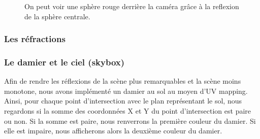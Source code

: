 \documentclass[11pt]{article}
\begin{document}
\begin{figure}[h!]

	\caption{On peut voir une sphère rouge derrière la caméra grâce à la reflexion de la sphère centrale.}
	\label{reflectionsDemo}
\end{figure}
\FloatBarrier

\subsubsection{Les réfractions}
\label{refractions}

\subsubsection{Le damier et le ciel (skybox)}
Afin de rendre les réflexions de la scène plus remarquables et la scène moins monotone, nous avons implémenté un damier au sol au moyen d'UV mapping. Ainsi, pour chaque point d'intersection avec le plan représentant le sol, nous regardons si la somme des coordonnées X et Y du point d'intersection est paire ou non. Si la somme est paire, nous renverrons la première couleur du damier. Si elle est impaire, nous afficherons alors la deuxième couleur du damier.\\
\end{document}
